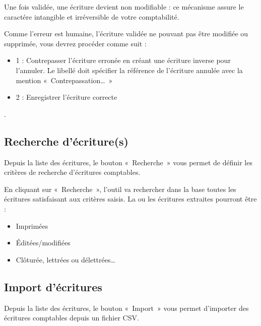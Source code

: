 \documentclass[a4paper,10pt,oneside,french]{sphinxmanual}
\begin{document}
Une fois validée, une écriture devient non modifiable : ce mécanisme assure le caractére intangible et irréversible de votre comptabilité.

Comme l’erreur est humaine, l’écriture validée ne pouvant pas être modifiée ou supprimée, vous devrez procéder comme suit :
\begin{itemize}
\item {} 
1 : Contrepasser l’écriture erronée en créant une écriture inverse pour l’annuler. Le libellé doit spécifier la référence de l’écriture annulée avec la mention « Contrepassation… »

\item {} 
2 : Enregistrer l’écriture correcte

\end{itemize}

.


\subsection{Recherche d’écriture(s)}
\label{\detokenize{accounting/entity:recherche-d-ecriture-s}}
Depuis la liste des écritures, le bouton « Recherche » vous permet de définir les critères de recherche d’écritures comptables.
\begin{quote}

\noindent{}
\end{quote}

En cliquant sur « Recherche », l’outil va rechercher dans la base toutes les écritures satisfaisant aux critères saisis.
La ou les écritures extraites pourront être :
\begin{itemize}
\item {} 
Imprimées

\item {} 
Éditées/modifiées

\item {} 
Clôturée, lettrées ou délettrées…

\end{itemize}


\subsection{Import d’écritures}
\label{\detokenize{accounting/entity:import-d-ecritures}}
Depuis la liste des écritures, le bouton « Import » vous permet d’importer des écritures comptables depuis un fichier CSV.
\end{document}
